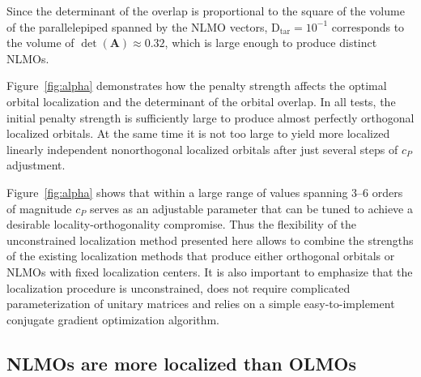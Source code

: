 \documentclass[aps,prl,reprint,amsmath,amssymb]{revtex4-1}
\begin{document}
Since the determinant of the overlap is proportional to the square of the volume of the parallelepiped spanned by the NLMO vectors, $\text{D}_{\text{tar}}=10^{-1}$ corresponds to the volume of $\det(\mathbf{A})\approx 0.32$, which is large enough to produce distinct NLMOs.

Figure~\ref{fig:alpha} demonstrates how the penalty strength affects the optimal orbital localization and the determinant of the orbital overlap. In all tests, the initial penalty strength is sufficiently large to produce almost perfectly orthogonal localized orbitals. At the same time it is not too large to yield more localized linearly independent nonorthogonal localized orbitals after just several steps of $c_P$ adjustment. %

Figure~\ref{fig:alpha} shows that within a large range of values spanning 3--6 orders of magnitude $c_P$ serves as an adjustable parameter that can be tuned to achieve a desirable locality-orthogonality compromise. 
Thus the flexibility of the unconstrained localization method presented here allows to combine the strengths of the existing localization methods that produce either orthogonal orbitals or NLMOs with fixed localization centers. It is also important to emphasize that the localization procedure is unconstrained, does not require complicated parameterization of unitary matrices and relies on a simple easy-to-implement conjugate gradient optimization algorithm. 


\subsection{NLMOs are more localized than OLMOs}
\end{document}
